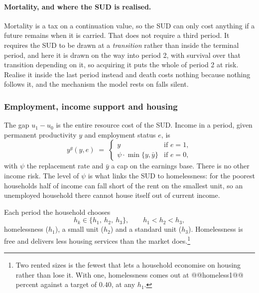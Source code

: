 \documentclass[10pt]{article}
\begin{document}
\paragraph{Mortality, and where the SUD is realised.} Mortality is a tax on
a continuation value, so the SUD can only cost anything if a future remains
when it is carried. That does not require a third period. It requires the
SUD to be drawn at a \emph{transition} rather than inside the terminal
period, and here it is drawn on the way into period 2, with survival over that
transition depending on it, so acquiring it puts the whole of period 2 at risk.
Realise it inside the last period instead and death costs nothing because
nothing follows it, and the mechanism the model rests on falls silent.


\subsubsection{Employment, income support and housing}\label{sec:support}

The gap $u_1-u_0$ is the entire resource cost of the SUD. Income in a
period, given permanent productivity $y$ and employment status $e$, is
\begin{equation}\label{eq:inc}
y^{g}(y,e) \;=\;
\begin{cases}
y & \text{if } e = 1,\\[0.2em]
\psi\cdot\min\{y,\bar y\} & \text{if } e = 0,
\end{cases}
\end{equation}
with $\psi$ the replacement rate and $\bar y$ a cap on the earnings base. There
is no other income risk. The level of $\psi$ is what links the SUD to
homelessness: for the poorest households half of income can fall short of the
rent on the smallest unit, so an unemployed household there cannot house itself
out of current income.

Each period the household chooses
\begin{equation}\label{eq:opts}
h_k \in \{h_1,\ h_2,\ h_3\}, \qquad h_1 < h_2 < h_3 ,
\end{equation}
homelessness ($h_1$), a small unit ($h_2$) and a standard unit
($h_3$). Homelessness is free and delivers less housing services than
the market does.\footnote{Two rented sizes is the fewest that lets a
household economise on housing rather than lose it. With one, homelessness comes
out at @@homeless1@@ percent against a target of $0.40$, at any $h_1$.}
\end{document}
